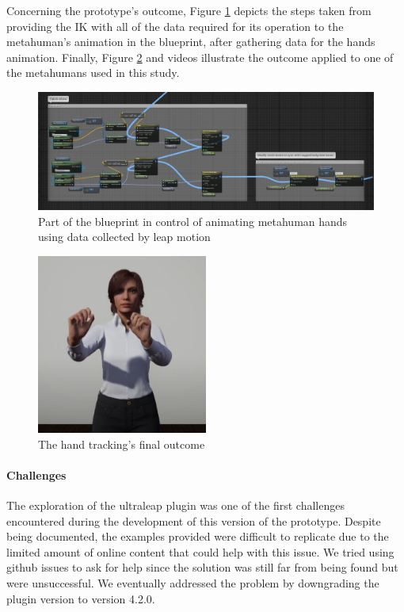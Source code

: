 Concerning the prototype's outcome, Figure \ref{fig:BPHandsAndIK} depicts the steps taken from providing the IK with all of the data required for its operation to the metahuman's animation in the blueprint, after gathering data for the hands animation. Finally, Figure \ref{fig:handTrack} and videos \cite{APT1,APT2} illustrate the outcome applied to one of the metahumans used in this study.

\begin{figure}[!htb]
\includegraphics[width=\textwidth]{figures/BPHandsAndIK.png}
\centering
\caption{Part of the blueprint in control of animating metahuman hands using data collected by leap motion}
\label{fig:BPHandsAndIK}
\end{figure}

\begin{figure}[!htb]
\includegraphics[width=0.5\textwidth]{figures/final.png}
\centering
\caption{The hand tracking's final outcome}
\label{fig:handTrack}
\end{figure}

\paragraph{Challenges}
The exploration of the ultraleap plugin was one of the first challenges encountered during the development of this version of the prototype. Despite being documented, the examples provided were difficult to replicate due to the limited amount of online content that could help with this issue. We tried using github issues to ask for help since the solution was still far from being found but were unsuccessful. We eventually addressed the problem by downgrading the plugin version to version 4.2.0. 

